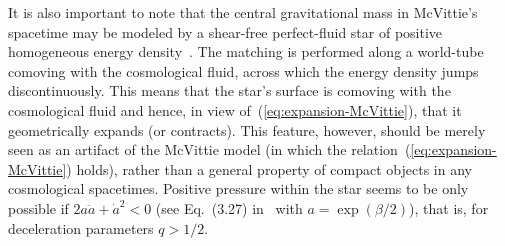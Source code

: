 \documentclass
[rmp,aps,twocolumn,showpacs,preprintnumbers,amsmath,amssymb]{revtex4}
\theoremstyle{plain}
\theoremstyle{definition}
\theoremstyle{remark}
\begin{document}
It is also important to note that the central gravitational mass in 
McVittie's spacetime may be modeled by a shear-free perfect-fluid star 
of positive homogeneous energy density~\cite{Nolan:1992}. The matching 
is performed along a world-tube comoving with the cosmological fluid, 
across which the energy density jumps discontinuously. This means that 
the star's surface is comoving with the cosmological fluid and hence, 
in view of~(\ref{eq:expansion-McVittie}), that it geometrically expands 
(or contracts). This feature, however, should be merely seen as an artifact 
of the McVittie model (in which the relation~(\ref{eq:expansion-McVittie}) 
holds), rather than a general property of compact objects in any cosmological 
spacetimes. Positive pressure within the star seems to be only possible if 
$2a\ddot a+{\dot a}^2<0$ (see Eq.~(3.27) in~\cite{Nolan:1992} with 
$a=\exp(\beta/2)$), that is, for deceleration parameters $q>1/2$. 
\end{document}
